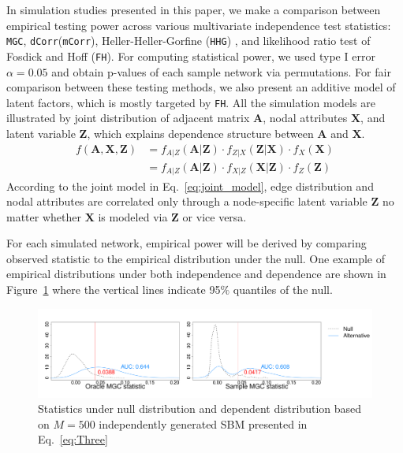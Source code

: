 \documentclass[12pt]{article}
\theoremstyle{definition}
\begin{document}
In simulation studies presented in this paper, we make a comparison between empirical testing power across various multivariate independence test statistics: \texttt{MGC}, \texttt{dCorr}(\texttt{mCorr}), Heller-Heller-Gorfine (\texttt{HHG}) \citep{heller2012consistent}, and likelihood ratio test of Fosdick and Hoff (\texttt{FH}). For computing statistical power, we used type I error $\alpha = 0.05$ and obtain p-values of each sample network via permutations. For fair comparison between these testing methods, we also present an additive model of latent factors, which is mostly targeted by \texttt{FH}.  All the simulation models are illustrated by joint distribution of adjacent matrix $\mathbf{A}$, nodal attributes $\mathbf{X}$, and latent variable $\mathbf{Z}$, which explains dependence structure between $\mathbf{A}$ and $\mathbf{X}$. 
\begin{equation}
\begin{split}
f(\mathbf{A}, \mathbf{X}, \mathbf{Z}) & = f_{A | Z}(\mathbf{A} | \mathbf{Z}) \cdot f_{Z | X}(\mathbf{Z} | \mathbf{X}) \cdot f_{X}(\mathbf{X}) 
\\ & = f_{A | Z}(\mathbf{A} | \mathbf{Z}) \cdot  f_{X | Z}(\mathbf{X} | \mathbf{Z} ) \cdot f_{Z} (\mathbf{Z}) 
\end{split}
\label{eq:joint_model}
\end{equation}	
According to the joint model in Eq.~\ref{eq:joint_model}, edge distribution and nodal attributes are correlated only through a node-specific latent variable $\mathbf{Z}$ no matter whether $\mathbf{X}$ is modeled via $\mathbf{Z}$ or vice versa. 

For each simulated network, empirical power will be derived by comparing observed statistic to the empirical distribution under the null. One example of empirical distributions under both independence and dependence are shown in Figure~\ref{fig:density} where the vertical lines indicate 95$\%$ quantiles of the null.
\begin{figure}[H]
	\centering
	\includegraphics[width=6in]{../Figure/density.pdf}
	\caption{Statistics under null distribution and dependent distribution based on $M = 500$ independently generated SBM presented in Eq.~\ref{eq:Three}}
	\label{fig:density}
\end{figure}		
						
\end{document}
